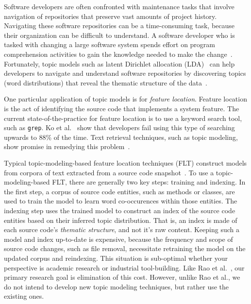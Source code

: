 
Software developers are often confronted with maintenance tasks that involve
navigation of repositories that preserve vast amounts of project history.
Navigating these software repositories can be a time-consuming task, because
their organization can be difficult to understand.  A software developer who is
tasked with changing a large software system spends effort on program
comprehension activities to gain the knowledge needed to make the
change~\cite{Corbi:1989}.  Fortunately, topic models such as latent Dirichlet
allocation (LDA)~\cite{Blei-etal:2003} can help developers to navigate and
understand software repositories by discovering topics (word distributions) that
reveal the thematic structure of the
data~\cite{Linstead-etal:2007,Thomas-etal:2011,Hindle-etal:2014}.

One particular application of topic models is for \emph{feature location}.
Feature location is the act of identifying the source code that implements
a system feature.  The current state-of-the-practice for feature location is to
use a keyword search tool, such as \texttt{grep}.  Ko et al.~\cite{Ko-etal:2006}
show that developers fail using this type of searching upwards to 88\% of the
time.  Text retrieval techniques, such as topic modeling, show promise in
remedying this problem~\cite{Marcus-etal:2004}.

Typical topic-modeling-based feature location techniques (FLT) construct models
from corpora of text extracted from a source code
snapshot~\cite{Dit-etal:2011}.  To use a topic-modeling-based FLT, there are
generally two key steps: training and indexing.  In the first step, a corpus of
source code entities, such as methods or classes, are used to train the model to
learn word co-occurences within those entities.  The indexing step uses the
trained model to construct an index of the source code entities based on their
inferred topic distribution.  That is, an index is made of each source code's
\emph{thematic structure}, and not it's raw content.  Keeping such a model and
index up-to-date is expensive, because the frequency and scope of source code
changes, such as file removal, necessitate retraining the model on the updated
corpus and reindexing.  This situation is sub-optimal whether your perspective
is academic research or industrial tool-building.  Like Rao et
al.~\cite{Rao-etal:2013}, our primary research goal is elimination of this cost.
However, unlike Rao et al., we do not intend to develop new topic modeling
techniques, but rather use the existing ones.

